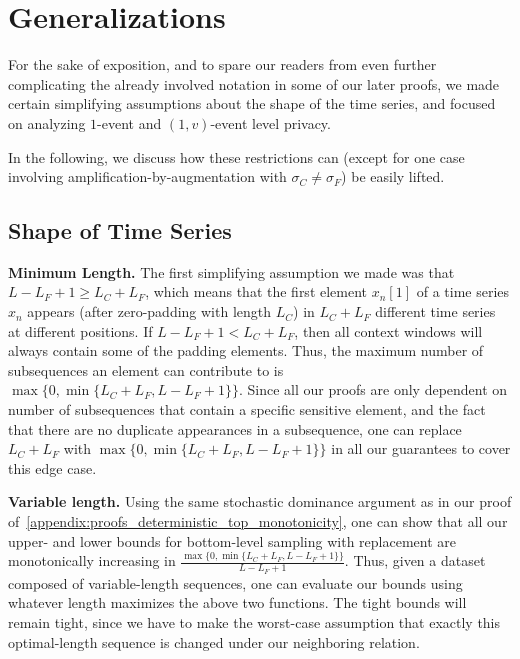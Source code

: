 \section{Generalizations}\label{appendix:generalizations}
For the sake of exposition, and to spare our readers from even further complicating the already involved notation in some of our later proofs, 
we made certain simplifying assumptions about 
the shape of the time series,
and focused on analyzing $1$-event and $(1,v)$-event level privacy.

In the following, we discuss how these restrictions can  (except for one case involving  amplification-by-augmentation with $\sigma_C \neq \sigma_F$) be easily lifted.

\subsection{Shape of Time Series}

\textbf{Minimum Length.} The first simplifying assumption we made was that $L - L_F + 1 \geq L_C + L_F$, which means that the first element $x_n[1]$ of a time series $x_n$ appears (after zero-padding with length $L_C$) in $L_C + L_F$ different time series at different positions.
If $L - L_F + 1 < L_C + L_F$, then all context windows will always contain some of the padding elements. Thus, the maximum  number of subsequences an element can contribute to is
$\max\{0, \min\{ L_C + L_F, L - L_F + 1\}\}$.
Since all our proofs are only dependent on number of subsequences that contain a specific sensitive element, and the fact that there are no duplicate appearances in a subsequence, 
one can replace $L_C + L_F$ with $\max\{0, \min\{ L_C + L_F, L - L_F + 1\}\}$ in all our guarantees to cover this edge case.

\textbf{Variable length.}
Using the same stochastic dominance argument as in our proof of~\cref{appendix:proofs_deterministic_top_monotonicity}, one can show that
 all our upper- and lower bounds for bottom-level sampling with replacement are monotonically increasing in $\frac{\max\{0, \min\{ L_C + L_F, L - L_F + 1\}\}}{L - L_F + 1}$. 
Thus, given a dataset composed of variable-length sequences, one can evaluate our bounds using whatever length maximizes the above two functions. The tight bounds will remain tight, since we have to make the worst-case assumption that exactly this optimal-length sequence is changed under our neighboring relation.

